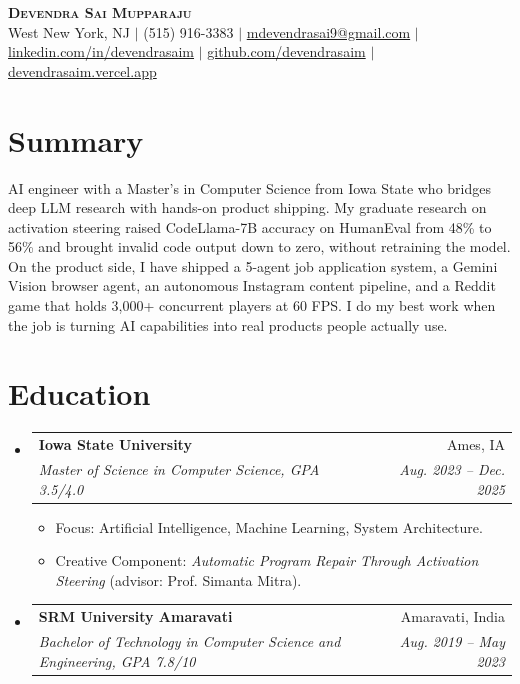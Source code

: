 \documentclass[letterpaper,11pt]{article}
\makeatletter
\newcommand{\resumeItem}[1]{
  \item\small{
    {#1 \vspace{-2pt}}
  }
}
\newcommand{\resumeSubheading}[4]{
  \vspace{-2pt}\item
    \begin{tabular*}{0.97\textwidth}[t]{l@{\extracolsep{\fill}}r}
      \textbf{#1} & #2 \\
      \textit{\small#3} & \textit{\small #4} \\
    \end{tabular*}\vspace{-7pt}
}
\newcommand{\resumeSubHeadingListStart}{\begin{itemize}[leftmargin=0.15in, label={}]}
\newcommand{\resumeSubHeadingListEnd}{\end{itemize}}
\newcommand{\resumeItemListStart}{\begin{itemize}}
\newcommand{\resumeItemListEnd}{\end{itemize}\vspace{-5pt}}
\makeatother
\begin{document}
\begin{center}
    \textbf{\Huge \scshape Devendra Sai Mupparaju} \\ \vspace{2pt}
    \small West New York, NJ $|$ (515) 916-3383 $|$ \href{mailto:mdevendrasai9@gmail.com}{mdevendrasai9@gmail.com} $|$
    \href{https://linkedin.com/in/devendrasaim}{linkedin.com/in/devendrasaim} $|$
    \href{https://github.com/devendrasaim}{github.com/devendrasaim} $|$
    \href{https://devendrasaim.vercel.app}{devendrasaim.vercel.app}
\end{center}

\section{Summary}
 \begin{itemize}[leftmargin=0.15in, label={}]
    \small{\item{
     AI engineer with a Master's in Computer Science from Iowa State who bridges deep LLM research with hands-on product shipping. My graduate research on activation steering raised CodeLlama-7B accuracy on HumanEval from 48\% to 56\% and brought invalid code output down to zero, without retraining the model. On the product side, I have shipped a 5-agent job application system, a Gemini Vision browser agent, an autonomous Instagram content pipeline, and a Reddit game that holds 3{,}000+ concurrent players at 60 FPS. I do my best work when the job is turning AI capabilities into real products people actually use.
    }}
 \end{itemize}

\section{Education}
  \resumeSubHeadingListStart
    \resumeSubheading
      {Iowa State University}{Ames, IA}
      {Master of Science in Computer Science, GPA 3.5/4.0}{Aug. 2023 -- Dec. 2025}
      \resumeItemListStart
        \resumeItem{Focus: Artificial Intelligence, Machine Learning, System Architecture.}
        \resumeItem{Creative Component: \textit{Automatic Program Repair Through Activation Steering} (advisor: Prof. Simanta Mitra).}
      \resumeItemListEnd
    \resumeSubheading
      {SRM University Amaravati}{Amaravati, India}
      {Bachelor of Technology in Computer Science and Engineering, GPA 7.8/10}{Aug. 2019 -- May 2023}
  \resumeSubHeadingListEnd
\end{document}
